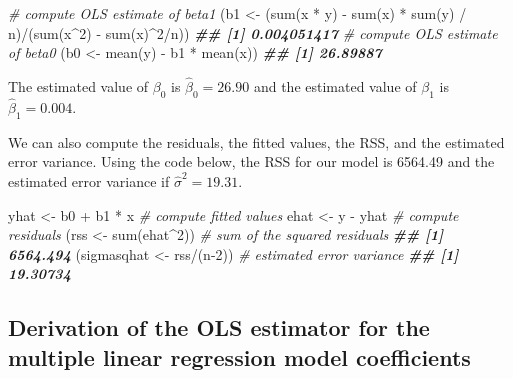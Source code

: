 \documentclass[
]{book}
\newenvironment{Shaded}{\begin{snugshade}}{\end{snugshade}}
\newcommand{\CommentTok}[1]{\textcolor[rgb]{0.56,0.35,0.01}{\textit{#1}}}
\newcommand{\DecValTok}[1]{\textcolor[rgb]{0.00,0.00,0.81}{#1}}
\newcommand{\DocumentationTok}[1]{\textcolor[rgb]{0.56,0.35,0.01}{\textbf{\textit{#1}}}}
\newcommand{\FunctionTok}[1]{\textcolor[rgb]{0.00,0.00,0.00}{#1}}
\newcommand{\NormalTok}[1]{#1}
\newcommand{\OtherTok}[1]{\textcolor[rgb]{0.56,0.35,0.01}{#1}}
\newcommand{\SpecialCharTok}[1]{\textcolor[rgb]{0.00,0.00,0.00}{#1}}
\theoremstyle{definition}
\theoremstyle{definition}
\theoremstyle{definition}
\theoremstyle{definition}
\theoremstyle{remark}
\begin{document}
\begin{Shaded}
\begin{Highlighting}[]
\CommentTok{\# compute OLS estimate of beta1}
\NormalTok{(b1 }\OtherTok{\textless{}{-}}\NormalTok{ (}\FunctionTok{sum}\NormalTok{(x }\SpecialCharTok{*}\NormalTok{ y) }\SpecialCharTok{{-}} \FunctionTok{sum}\NormalTok{(x) }\SpecialCharTok{*} \FunctionTok{sum}\NormalTok{(y) }\SpecialCharTok{/}\NormalTok{ n)}\SpecialCharTok{/}\NormalTok{(}\FunctionTok{sum}\NormalTok{(x}\SpecialCharTok{\^{}}\DecValTok{2}\NormalTok{) }\SpecialCharTok{{-}} \FunctionTok{sum}\NormalTok{(x)}\SpecialCharTok{\^{}}\DecValTok{2}\SpecialCharTok{/}\NormalTok{n))}
\DocumentationTok{\#\# [1] 0.004051417}
\CommentTok{\# compute OLS estimate of beta0}
\NormalTok{(b0 }\OtherTok{\textless{}{-}} \FunctionTok{mean}\NormalTok{(y) }\SpecialCharTok{{-}}\NormalTok{ b1 }\SpecialCharTok{*} \FunctionTok{mean}\NormalTok{(x))}
\DocumentationTok{\#\# [1] 26.89887}
\end{Highlighting}
\end{Shaded}

The estimated value of \(\beta_0\) is \(\hat{\beta}_0=26.90\) and the estimated value of \(\beta_1\) is \(\hat{\beta}_1=0.004\).

We can also compute the residuals, the fitted values, the RSS, and the estimated error variance. Using the code below, the RSS for our model is 6564.49 and the estimated error variance if \(\hat{\sigma}^2=19.31\).

\begin{Shaded}
\begin{Highlighting}[]
\NormalTok{yhat }\OtherTok{\textless{}{-}}\NormalTok{ b0 }\SpecialCharTok{+}\NormalTok{ b1 }\SpecialCharTok{*}\NormalTok{ x }\CommentTok{\# compute fitted values}
\NormalTok{ehat }\OtherTok{\textless{}{-}}\NormalTok{ y }\SpecialCharTok{{-}}\NormalTok{ yhat }\CommentTok{\# compute residuals}
\NormalTok{(rss }\OtherTok{\textless{}{-}} \FunctionTok{sum}\NormalTok{(ehat}\SpecialCharTok{\^{}}\DecValTok{2}\NormalTok{)) }\CommentTok{\# sum of the squared residuals}
\DocumentationTok{\#\# [1] 6564.494}
\NormalTok{(sigmasqhat }\OtherTok{\textless{}{-}}\NormalTok{ rss}\SpecialCharTok{/}\NormalTok{(n}\DecValTok{{-}2}\NormalTok{)) }\CommentTok{\# estimated error variance}
\DocumentationTok{\#\# [1] 19.30734}
\end{Highlighting}
\end{Shaded}

\hypertarget{mlr-derivation}{%
\subsection{Derivation of the OLS estimator for the multiple linear regression model coefficients}\label{mlr-derivation}}
\end{document}
